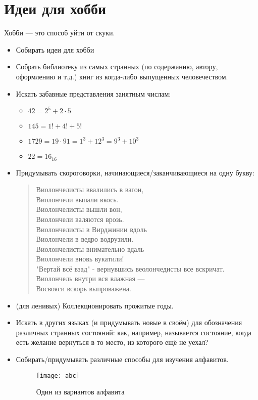 \section{Идеи для хобби}
Хобби --- это способ уйти от скуки.
\begin{itemize}
\item Собирать идеи для хобби
\item Собрать библиотеку из самых странных (по содержанию, автору, оформлению и т.д.) книг из когда-либо выпущенных человечеством.
\item Искать забавные представления занятным числам:
  \begin{itemize}
    \item  $42 = 2^5 + 2 \cdot 5$
    \item  $145 = 1! + 4! + 5!$
    \item  $1729 = 19 \cdot 91 = 1^3 + 12^3 = 9^3 + 10^3$
    \item  $22 = 16_{16}$
  \end{itemize}
\item Придумывать скороговорки, начинающиеся/заканчивающиеся на одну букву:
\begin{flushleft}
\begin{verse}
Виолончелисты ввалились в вагон,\\
Виолончели выпали вкось.\\
Виолончелисты вышли вон,\\
Виолончели валяются врозь.\\

Виолончелисты в Вирджинии вдоль\\
Виолончели в ведро водрузили.\\
Виолончелисты внимательно вдаль\\
Виолончели вновь вукатили!\\

"Вертай всё взад" - вернувшись веолончедисты все вскричат.\\
Виолончель внутри вся влажная ---\\
Восвояси вскорь выпроважена.
\end{verse}
\end{flushleft}

\item (для ленивых) Коллекционировать прожитые годы.
\item Искать в других языках (и придумывать новые в своём) для обозначения различных странных состояний: как, например, называется состояние, когда есть желание вернуться в то место, из которого ещё не уехал?
\item Собирать/придумывать различные способы для изучения алфавитов.
\begin{figure}[ht!]
    \centering
    \texttt{[image: abc]}
    \caption{Один из вариантов алфавита}
\end{figure}
\end{itemize}
